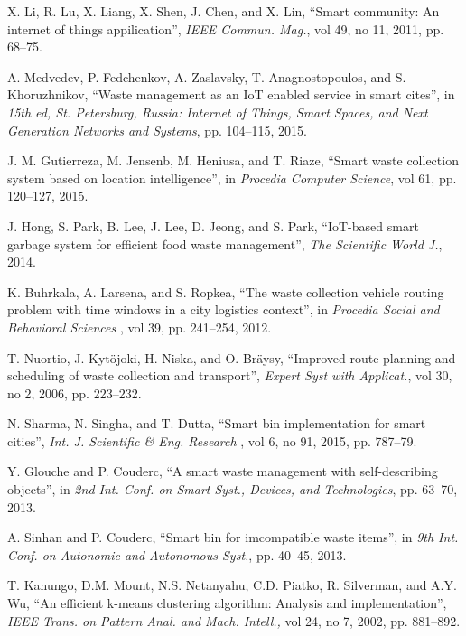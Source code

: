 \documentclass[conference]{IEEEtran}
\begin{document}
\begin{thebibliography}{1}
X. Li, R. Lu, X. Liang, X. Shen, J. Chen, and X. Lin, ``Smart community: An internet of things appilication'', \textit{IEEE Commun. Mag.}, vol 49, no 11, 2011, pp. 68--75.

A. Medvedev, P. Fedchenkov, A. Zaslavsky, T. Anagnostopoulos, and S. Khoruzhnikov, ``Waste management as an IoT enabled service in smart cites'', in \textit{15th ed, St. Petersburg, Russia: Internet of Things, Smart Spaces, and Next Generation Networks and Systems}, pp. 104--115, 2015.



J. M. Gutierreza, M. Jensenb, M. Heniusa, and T. Riaze, ``Smart waste collection system based on location intelligence'', in \textit{Procedia Computer Science}, vol 61, pp. 120--127, 2015.


J. Hong, S. Park, B. Lee, J. Lee, D. Jeong, and S. Park, ``IoT-based smart garbage system for efficient food waste management'', \textit{The Scientific World J.}, 2014.




K. Buhrkala, A. Larsena, and S. Ropkea, ``The waste collection vehicle routing problem with time windows in a city logistics context'', in \textit{Procedia Social and Behavioral Sciences} , vol 39, pp. 241--254, 2012.


T. Nuortio, J. Kyt\"ojoki, H. Niska, and O. Br\"aysy, ``Improved route planning and scheduling of waste collection and transport'', \textit{Expert Syst with Applicat.}, vol 30, no 2, 2006, pp. 223--232.


N. Sharma, N. Singha, and T. Dutta, ``Smart bin implementation for smart cities'', \textit{Int. J. Scientific \& Eng. Research }, vol 6, no 91, 2015, pp. 787--79.


Y. Glouche and P. Couderc, ``A smart waste management with self-describing objects'', in \textit{2nd Int. Conf. on Smart Syst., Devices, and Technologies}, pp. 63--70, 2013.


A. Sinhan and P. Couderc, ``Smart bin for imcompatible waste items'', in \textit{9th Int. Conf. on Autonomic and Autonomous Syst.}, pp. 40--45, 2013.


T. Kanungo, D.M. Mount, N.S. Netanyahu, C.D. Piatko, R. Silverman, and A.Y. Wu, ``An efficient k-means clustering algorithm: Analysis and implementation'', \textit{IEEE Trans. on Pattern Anal. and Mach. Intell.,} vol 24, no 7, 2002, pp. 881--892.



\end{thebibliography}
\end{document}
